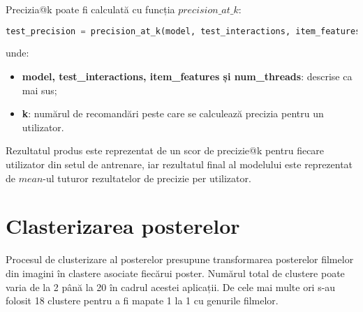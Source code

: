 Precizia@k poate fi calculată cu funcția $precision\_at\_k$:

\begin{lstlisting}[language=Python, caption=Precizia@k a unui model]
test_precision = precision_at_k(model, test_interactions, item_features=item_features, k=k, num_threads=threads).mean()
\end{lstlisting}
unde:
\begin{itemize}
	\item \textbf{model, test\_interactions, item\_features și num\_threads}: descrise ca mai sus;
	\item \textbf{k}: numărul de recomandări peste care se calculează precizia pentru un utilizator.
\end{itemize}
Rezultatul produs este reprezentat de un scor de precizie@k pentru fiecare utilizator din setul de antrenare, iar rezultatul final al modelului este reprezentat de $mean$-ul tuturor rezultatelor de precizie per utilizator.

\section{Clasterizarea posterelor}
Procesul de clusterizare al posterelor presupune transformarea posterelor filmelor din imagini în clastere asociate fiecărui poster. Numărul total de clustere poate varia de la 2 până la 20 în cadrul acestei aplicații. De cele mai multe ori s-au folosit 18 clustere pentru a fi mapate 1 la 1 cu genurile filmelor.

